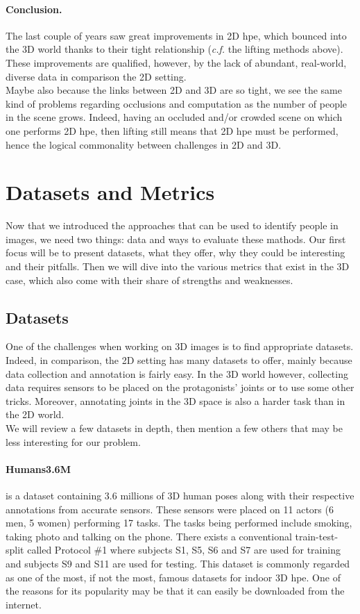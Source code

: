 \documentclass[runningheads]{llncs}
\begin{document}
\paragraph{Conclusion.} The last couple of years saw great improvements in 2D \ac{hpe}, which bounced into the 3D world thanks to their tight relationship (\textit{c.f.} the lifting methods above). These improvements are qualified, however, by the lack of abundant, real-world, diverse data in comparison the 2D setting. \\
Maybe also because the links between 2D and 3D are so tight, we see the same kind of problems regarding occlusions and computation as the number of people in the scene grows. Indeed, having an occluded and/or crowded scene on which one performs 2D \ac{hpe}, then lifting still means that 2D \ac{hpe} must be performed, hence the logical commonality between challenges in 2D and 3D.

\section{Datasets and Metrics}
Now that we introduced the approaches that can be used to identify people in images, we need two things: data and ways to evaluate these mathods. Our first focus will be to present datasets, what they offer, why they could be interesting and their pitfalls. Then we will dive into the various metrics that exist in the 3D case, which also come with their share of strengths and weaknesses.

\subsection{Datasets}
One of the challenges when working on 3D images is to find appropriate datasets. Indeed, in comparison, the 2D setting has many datasets to offer, mainly because data collection and annotation is fairly easy. In the 3D world however, collecting data requires sensors to be placed on the protagonists' joints or to use some other tricks. Moreover, annotating joints in the 3D space is also a harder task than in the 2D world. \\
We will review a few datasets in depth, then mention a few others that may be less interesting for our problem.
\paragraph{Humans3.6M} \cite{Human3.6M} is a dataset containing 3.6 millions of 3D human poses along with their respective annotations from accurate sensors. These sensors were placed on 11 actors (6 men, 5 women) performing 17 tasks. The tasks being performed include smoking, taking photo and talking on the phone. There exists a conventional train-test-split called Protocol \#1 where subjects S1, S5, S6 and S7 are used for training and subjects S9 and S11 are used for testing. This dataset is commonly regarded as one of the most, if not the most, famous datasets for indoor 3D \ac{hpe}. One of the reasons for its popularity may be that it can easily be downloaded from the internet.
\end{document}

